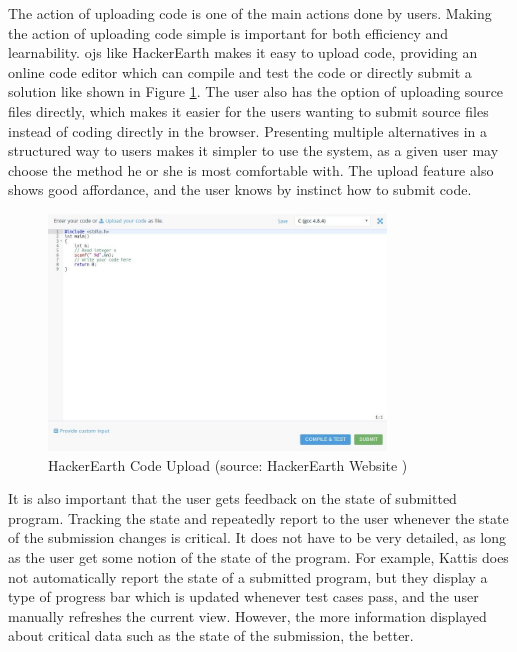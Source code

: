 The action of uploading code is one of the main actions done by users. Making the action of uploading code simple is important for both efficiency and learnability. \glspl{oj} like HackerEarth makes it easy to upload code, providing an online code editor which can compile and test the code or directly submit a solution like shown in Figure \ref{fig:hackerearth-upload}. The user also has the option of uploading source files directly, which makes it easier for the users wanting to submit source files instead of coding directly in the browser. Presenting multiple alternatives in a structured way to users makes it simpler to use the system, as a given user may choose the method he or she is most comfortable with. The upload feature also shows good affordance, and the user knows by instinct how to submit code. \\

\begin{figure}
    \centering
    \includegraphics[width=0.8\textwidth]{figs/hackerearth_upload.jpg}
    \caption[HackerEarth Code Upload]{HackerEarth Code Upload (source: HackerEarth Website \cite{HACKEREARTH})}
    \label{fig:hackerearth-upload}
\end{figure}

It is also important that the user gets feedback on the state of submitted program. Tracking the state and repeatedly report to the user whenever the state of the submission changes is critical. It does not have to be very detailed, as long as the user get some notion of the state of the program. For example, Kattis does not automatically report the state of a submitted program, but they display a type of progress bar which is updated whenever test cases pass, and the user manually refreshes the current view. However, the more information displayed about critical data such as the state of the submission, the better. \\

